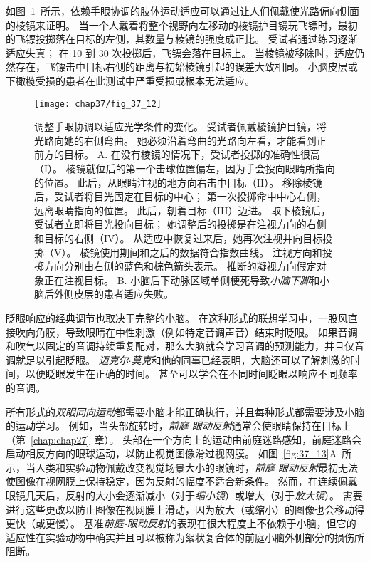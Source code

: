 如图~\ref{fig:37_12}~所示，依赖手眼协调的肢体运动适应可以通过让人们佩戴使光路偏向侧面的棱镜来证明。
当一个人戴着将整个视野向左移动的棱镜护目镜玩飞镖时，最初的飞镖投掷落在目标的左侧，其数量与棱镜的强度成正比。
受试者通过练习逐渐适应失真；
在 10 到 30 次投掷后，飞镖会落在目标上。
当棱镜被移除时，适应仍然存在，飞镖击中目标右侧的距离与初始棱镜引起的误差大致相同。
小脑皮层或下橄榄受损的患者在此测试中严重受损或根本无法适应。


\begin{figure}[htbp]
	\centering
	\texttt{[image: chap37/fig\_37\_12]}
	\caption{调整手眼协调以适应光学条件的变化。
		受试者佩戴棱镜护目镜，将光路向她的右侧弯曲。
		她必须沿着弯曲的光路向左看，才能看到正前方的目标\cite{martin1996throwing}。
		A. 在没有棱镜的情况下，受试者投掷的准确性很高（I）。
		棱镜就位后的第一个击球位置偏左，因为手会投向眼睛所指向的位置。
		此后，从眼睛注视的地方向右击中目标（II）。
		移除棱镜后，受试者将目光固定在目标的中心；
		第一次投掷命中中心右侧，远离眼睛指向的位置。
		此后，朝着目标（III）迈进。
		取下棱镜后，受试者立即将目光投向目标；
		她调整后的投掷是在注视方向的右侧和目标的右侧（IV）。
		从适应中恢复过来后，她再次注视并向目标投掷（V）。
		棱镜使用期间和之后的数据符合指数曲线。
		注视方向和投掷方向分别由右侧的蓝色和棕色箭头表示。
		推断的凝视方向假定对象正在注视目标。
		B. 小脑后下动脉区域单侧梗死导致\textit{小脑下脚}和小脑后外侧皮层的患者适应失败。}
	\label{fig:37_12}
\end{figure}


眨眼响应的经典调节也取决于完整的小脑。
在这种形式的联想学习中，一股风直接吹向角膜，导致眼睛在中性刺激（例如特定音调声音）结束时眨眼。
如果音调和吹气以固定的音调持续重复配对，那么大脑就会学习音调的预测能力，并且仅音调就足以引起眨眼。
\textit{迈克尔$\cdot$莫克}和他的同事已经表明，大脑还可以了解刺激的时间，以便眨眼发生在正确的时间。
甚至可以学会在不同时间眨眼以响应不同频率的音调。


所有形式的\textit{双眼同向运动}都需要小脑才能正确执行，并且每种形式都需要涉及小脑的运动学习。
例如，当头部旋转时，\textit{前庭-眼动反射}通常会使眼睛保持在目标上（第~\ref{chap:chap27}~章）。
头部在一个方向上的运动由前庭迷路感知，前庭迷路会启动相反方向的眼球运动，以防止视觉图像滑过视网膜。
如图~\ref{fig:37_13}A~所示，当人类和实验动物佩戴改变视觉场景大小的眼镜时，\textit{前庭-眼动反射}最初无法使图像在视网膜上保持稳定，因为反射的幅度不适合新条件。
然而，在连续佩戴眼镜几天后，反射的大小会逐渐减小（对于\textit{缩小镜}）或增大（对于\textit{放大镜}）。
需要进行这些更改以防止图像在视网膜上滑动，因为放大（或缩小）的图像也会移动得更快（或更慢）。
基准\textit{前庭-眼动反射}的表现在很大程度上不依赖于小脑，但它的适应性在实验动物中确实并且可以被称为絮状复合体的前庭小脑外侧部分的损伤所阻断。


